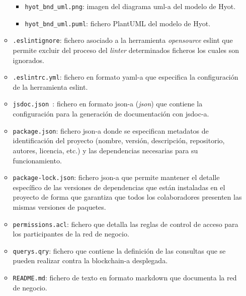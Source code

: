 \documentclass[12pt,a4paper, twoside]{report}
\begin{document}
\begin{itemize}
\begin{itemize}
				\begin{itemize}
				\item \texttt{hyot\_bnd\_uml.png}: imagen del diagrama \gls{uml-a} del modelo de Hyot.
				\item \texttt{hyot\_bnd\_uml.puml}: fichero PlantUML del modelo de Hyot.
			\end{itemize}
			\item \texttt{.eslintignore}: fichero asociado a la herramienta \textit{\gls{opensource}} \gls{eslint} que permite excluir del proceso del \textit{\gls{linter}} determinados ficheros los cuales son ignorados.	
			\item \texttt{.eslintrc.yml}: fichero en formato \gls{yaml-a} que especifica la configuración de la herramienta \gls{eslint}.
			\item \texttt{jsdoc.json	}: fichero en formato \gls{json-a} (\textit{\gls{json}}) que contiene la configuración para la generación de documentación con \gls{jsdoc-a}.
			\item \texttt{package.json}: fichero \gls{json-a} donde se especifican metadatos de identificación del proyecto (nombre, versión, descripción, repositorio, autores, licencia, etc.) y las dependencias necesarias para su funcionamiento.
			\item \texttt{package-lock.json}: fichero \gls{json-a} que permite mantener el detalle específico de las versiones de dependencias que están instaladas en el proyecto de forma que garantiza que todos los colaboradores presenten las mismas versiones de paquetes.
			\item \texttt{permissions.acl}: fichero que detalla las reglas de control de acceso para los participantes de la red de negocio.
			\item \texttt{\glspl{query}.qry}: fichero que contiene la definición de las consultas que se pueden realizar contra la \gls{blockchain-a} desplegada.
			\item \texttt{README.md}: fichero de texto en formato \gls{markdown} que documenta la red de negocio.
		\end{itemize}	
				

\end{itemize}
\end{document}
